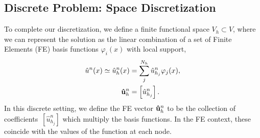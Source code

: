 \documentclass[../../thesis.tex]{subfiles}
\begin{document}
\subsection{Discrete Problem: Space Discretization}
To complete our discretization, we define a finite functional space $V_h \subset V$, where we can represent the solution as the linear combination of a set of Finite Elements (FE) basis functions $\varphi_i(x)$ with local support,
\begin{align}
    \hat{u}^{n}(x) \simeq \hat{u}_h^n(x) &= \sum_j^{N_h} \hat{u}_{h_j}^n \varphi_j(x), \\
    \vb{\hat{u}}_h^{n} &= \left[\hat{u}_{h_j}^n\right].
\end{align}
In this discrete setting, we define the FE vector $\vb{\hat{u}}_h^{n}$ to be the collection of coefficients~$[\hat{u}_{h_j}^n]$ which multiply the basis functions.
In the FE context, these coincide with the values of the function at each node.
\end{document}
